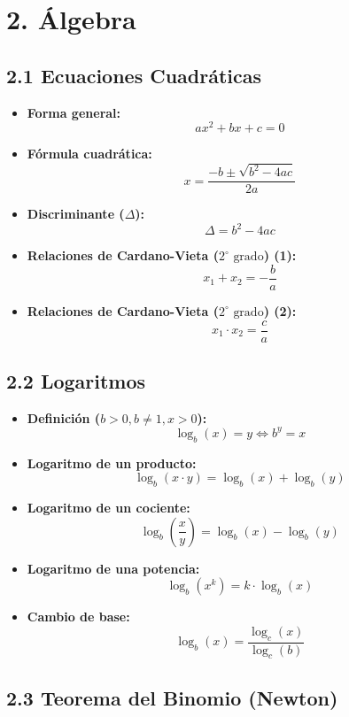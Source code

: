 \documentclass[11pt,a4paper]{article}
\begin{document}
\section*{2. Álgebra}

\subsection*{2.1 Ecuaciones Cuadráticas}

\begin{itemize}
  \item \textbf{Forma general:}
  \[
    ax^2 + bx + c = 0
  \]
  \item \textbf{Fórmula cuadrática:}
  \[
    x = \frac{-b \pm \sqrt{b^2 - 4ac}}{2a}
  \]
  \item \textbf{Discriminante ($\Delta$):}
  \[
    \Delta = b^2 - 4ac
  \]
  \item \textbf{Relaciones de Cardano-Vieta ($2^\circ \text{ grado}$) (1):}
  \[
    x_1 + x_2 = -\frac{b}{a}
  \]
  \item \textbf{Relaciones de Cardano-Vieta ($2^\circ \text{ grado}$) (2):}
  \[
    x_1 \cdot x_2 = \frac{c}{a}
  \]
\end{itemize}

\subsection*{2.2 Logaritmos}

\begin{itemize}
  \item \textbf{Definición ($b > 0, b \ne 1, x > 0$):}
  \[
    \log_b(x) = y \iff b^y = x
  \]
  \item \textbf{Logaritmo de un producto:}
  \[
    \log_b(x \cdot y) = \log_b(x) + \log_b(y)
  \]
  \item \textbf{Logaritmo de un cociente:}
  \[
    \log_b\left(\frac{x}{y}\right) = \log_b(x) - \log_b(y)
  \]
  \item \textbf{Logaritmo de una potencia:}
  \[
    \log_b(x^k) = k \cdot \log_b(x)
  \]
  \item \textbf{Cambio de base:}
  \[
    \log_b(x) = \frac{\log_c(x)}{\log_c(b)}
  \]
\end{itemize}

\subsection*{2.3 Teorema del Binomio (Newton)}
\end{document}
